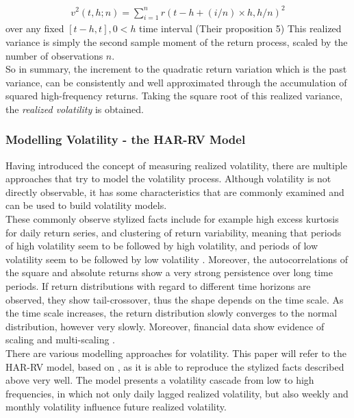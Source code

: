 \begin{align}\label{eq:RV-andersen}
v^2(t,h;n) = \sum_{i=1}^{n} r(t-h+(i/n) \times h,h/n)^2
\end{align}
over any fixed $[t-h,t], 0 < h$ time interval (Their proposition 5) This realized variance is simply the second sample moment of the return process, scaled by the number of observations $n$.\\
So in summary, the increment to the quadratic return variation which is the past variance, can be consistently and well approximated through the accumulation of squared high-frequency returns. Taking the square root of this realized variance, the \emph{realized volatility} is obtained.


\subsubsection{Modelling Volatility - the HAR-RV Model}\label{sec:222HAR-RV}
Having introduced the concept of measuring realized volatility, there are multiple approaches that try to model the volatility process. Although volatility is not directly observable, it has some characteristics that are commonly examined and can be used to build volatility models. \\
These commonly observe stylized facts include for example high excess kurtosis for daily return series, and clustering of return variability, meaning that periods of high volatility seem to be followed by high volatility, and periods of low volatility seem to be followed by low volatility \parencite{tsay2005}. Moreover, the autocorrelations of the square and absolute returns show a very strong persistence over long time periods. If return distributions with regard to different time horizons are observed, they show tail-crossover, thus the shape depends on the time scale. As the time scale increases, the return distribution slowly converges to the normal distribution, however very slowly. Moreover, financial data show evidence of scaling and multi-scaling \textcite{corsi2009}. \\
There are various modelling approaches for volatility. This paper will refer to the HAR-RV model, based on \textcite{corsi2009}, as it is able to reproduce the stylized facts described above very well. The model presents a volatility cascade from low to high frequencies, in which not only daily lagged realized volatility, but also weekly and monthly volatility influence future realized volatility.\\
